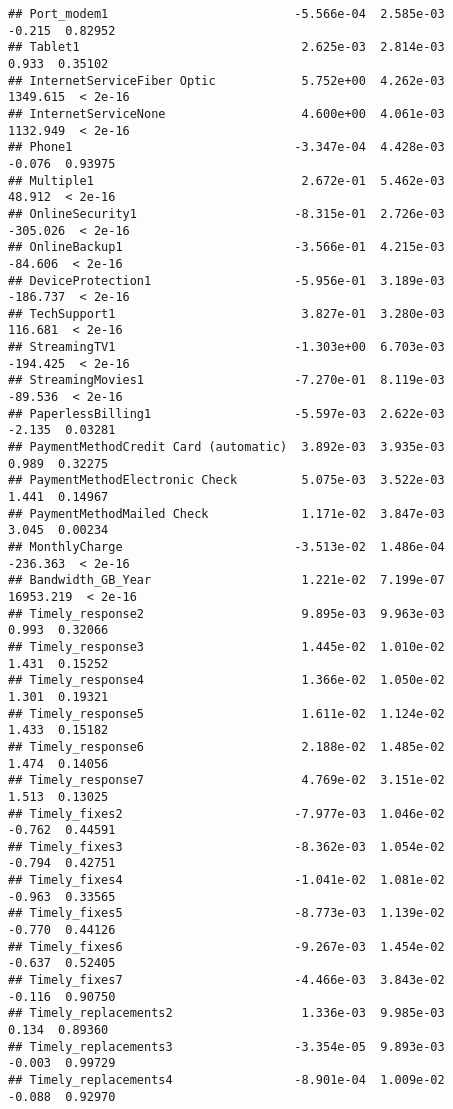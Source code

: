 \documentclass[
]{article}
\begin{document}
\begin{verbatim}
## Port_modem1                          -5.566e-04  2.585e-03    -0.215  0.82952
## Tablet1                               2.625e-03  2.814e-03     0.933  0.35102
## InternetServiceFiber Optic            5.752e+00  4.262e-03  1349.615  < 2e-16
## InternetServiceNone                   4.600e+00  4.061e-03  1132.949  < 2e-16
## Phone1                               -3.347e-04  4.428e-03    -0.076  0.93975
## Multiple1                             2.672e-01  5.462e-03    48.912  < 2e-16
## OnlineSecurity1                      -8.315e-01  2.726e-03  -305.026  < 2e-16
## OnlineBackup1                        -3.566e-01  4.215e-03   -84.606  < 2e-16
## DeviceProtection1                    -5.956e-01  3.189e-03  -186.737  < 2e-16
## TechSupport1                          3.827e-01  3.280e-03   116.681  < 2e-16
## StreamingTV1                         -1.303e+00  6.703e-03  -194.425  < 2e-16
## StreamingMovies1                     -7.270e-01  8.119e-03   -89.536  < 2e-16
## PaperlessBilling1                    -5.597e-03  2.622e-03    -2.135  0.03281
## PaymentMethodCredit Card (automatic)  3.892e-03  3.935e-03     0.989  0.32275
## PaymentMethodElectronic Check         5.075e-03  3.522e-03     1.441  0.14967
## PaymentMethodMailed Check             1.171e-02  3.847e-03     3.045  0.00234
## MonthlyCharge                        -3.513e-02  1.486e-04  -236.363  < 2e-16
## Bandwidth_GB_Year                     1.221e-02  7.199e-07 16953.219  < 2e-16
## Timely_response2                      9.895e-03  9.963e-03     0.993  0.32066
## Timely_response3                      1.445e-02  1.010e-02     1.431  0.15252
## Timely_response4                      1.366e-02  1.050e-02     1.301  0.19321
## Timely_response5                      1.611e-02  1.124e-02     1.433  0.15182
## Timely_response6                      2.188e-02  1.485e-02     1.474  0.14056
## Timely_response7                      4.769e-02  3.151e-02     1.513  0.13025
## Timely_fixes2                        -7.977e-03  1.046e-02    -0.762  0.44591
## Timely_fixes3                        -8.362e-03  1.054e-02    -0.794  0.42751
## Timely_fixes4                        -1.041e-02  1.081e-02    -0.963  0.33565
## Timely_fixes5                        -8.773e-03  1.139e-02    -0.770  0.44126
## Timely_fixes6                        -9.267e-03  1.454e-02    -0.637  0.52405
## Timely_fixes7                        -4.466e-03  3.843e-02    -0.116  0.90750
## Timely_replacements2                  1.336e-03  9.985e-03     0.134  0.89360
## Timely_replacements3                 -3.354e-05  9.893e-03    -0.003  0.99729
## Timely_replacements4                 -8.901e-04  1.009e-02    -0.088  0.92970

\end{verbatim}
\end{document}
